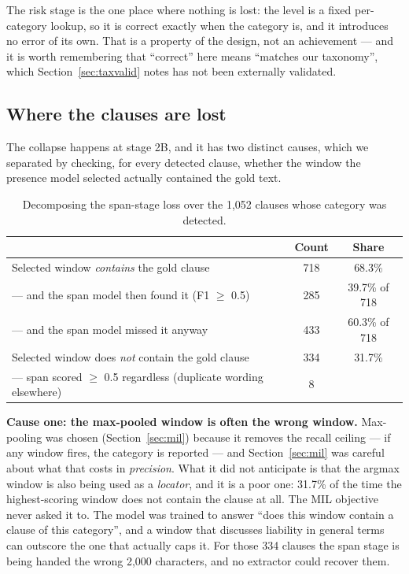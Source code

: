 The risk stage is the one place where nothing is lost: the level is a fixed per-category lookup, so it is correct exactly when the category is, and it introduces no error of its own. That is a property of the design, not an achievement --- and it is worth remembering that ``correct'' here means ``matches our taxonomy'', which Section~\ref{sec:taxvalid} notes has not been externally validated.

\subsection{Where the clauses are lost}
The collapse happens at stage 2B, and it has two distinct causes, which we separated by checking, for every detected clause, whether the window the presence model selected actually contained the gold text.

\begin{table}[ht]
\centering
\caption{Decomposing the span-stage loss over the 1{,}052 clauses whose category was detected.}
\label{tab:e2eattr}
\small
\begin{tabular}{lcc}
\toprule
 & \textbf{Count} & \textbf{Share}\\
\midrule
Selected window \emph{contains} the gold clause & 718 & 68.3\%\\
\quad --- and the span model then found it (F1 $\geq$ 0.5) & 285 & 39.7\% of 718\\
\quad --- and the span model missed it anyway & 433 & 60.3\% of 718\\
Selected window does \emph{not} contain the gold clause & 334 & 31.7\%\\
\quad --- span scored $\geq$ 0.5 regardless (duplicate wording elsewhere) & 8 & \\
\bottomrule
\end{tabular}
\end{table}

\textbf{Cause one: the max-pooled window is often the wrong window.} Max-pooling was chosen (Section~\ref{sec:mil}) because it removes the recall ceiling --- if any window fires, the category is reported --- and Section~\ref{sec:mil} was careful about what that costs in \emph{precision}. What it did not anticipate is that the argmax window is also being used as a \emph{locator}, and it is a poor one: 31.7\% of the time the highest-scoring window does not contain the clause at all. The MIL objective never asked it to. The model was trained to answer ``does this window contain a clause of this category'', and a window that discusses liability in general terms can outscore the one that actually caps it. For those 334 clauses the span stage is being handed the wrong 2{,}000 characters, and no extractor could recover them.

